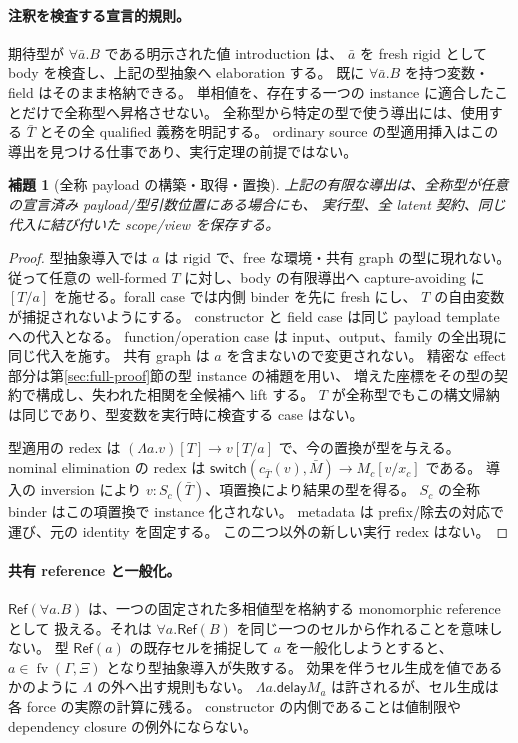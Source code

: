 \documentclass[11pt,a4paper]{article}
\newtheorem{lemma}[definition]{補題}
\newcommand{\Delay}{\mathsf{delay}}
\newcommand{\fv}{\operatorname{fv}}
\begin{document}
\paragraph{注釈を検査する宣言的規則。}
期待型が \(\forall\bar a.B\) である明示された値 introduction は、
\(\bar a\) を fresh rigid として body を検査し、上記の型抽象へ elaboration する。
既に \(\forall\bar a.B\) を持つ変数・field はそのまま格納できる。
単相値を、存在する一つの instance に適合したことだけで全称型へ昇格させない。
全称型から特定の型で使う導出には、使用する \(\bar T\) とその全 qualified 義務を明記する。
ordinary source の型適用挿入はこの導出を見つける仕事であり、実行定理の前提ではない。

\begin{lemma}[全称 payload の構築・取得・置換]
\label{lem:rank2-payload}
上記の有限な導出は、全称型が任意の宣言済み payload/型引数位置にある場合にも、
実行型、全 latent 契約、同じ代入に結び付いた scope/view を保存する。
\end{lemma}
\begin{proof}
型抽象導入では \(a\) は rigid で、free な環境・共有 graph の型に現れない。
従って任意の well-formed \(T\) に対し、body の有限導出へ capture-avoiding に
\([T/a]\) を施せる。forall case では内側 binder を先に fresh にし、
\(T\) の自由変数が捕捉されないようにする。
constructor と field case は同じ payload template への代入となる。
function/operation case は input、output、family の全出現に同じ代入を施す。
共有 graph は \(a\) を含まないので変更されない。
精密な effect 部分は第\ref{sec:full-proof}節の型 instance の補題を用い、
増えた座標をその型の契約で構成し、失われた相関を全候補へ lift する。
\(T\) が全称型でもこの構文帰納は同じであり、型変数を実行時に検査する case はない。

型適用の redex は
\((\Lambda a.v)[T]\longrightarrow v[T/a]\) で、今の置換が型を与える。
nominal elimination の redex は
\(\mathsf{switch}(c_{\bar T}(v),\bar M)\longrightarrow M_c[v/x_c]\) である。
導入の inversion により \(v:S_c(\bar T)\)、項置換により結果の型を得る。
\(S_c\) の全称 binder はこの項置換で instance 化されない。
metadata は prefix/除去の対応で運び、元の identity を固定する。
この二つ以外の新しい実行 redex はない。
\end{proof}

\paragraph{共有 reference と一般化。}
\(\mathsf{Ref}(\forall a.B)\) は、一つの固定された多相値型を格納する monomorphic reference として
扱える。それは \(\forall a.\mathsf{Ref}(B)\) を同じ一つのセルから作れることを意味しない。
型 \(\mathsf{Ref}(a)\) の既存セルを捕捉して \(a\) を一般化しようとすると、
\(a\in\fv(\Gamma,\Xi)\) となり型抽象導入が失敗する。
効果を伴うセル生成を値であるかのように \(\Lambda\) の外へ出す規則もない。
\(\Lambda a.\Delay M_a\) は許されるが、セル生成は各 force の実際の計算に残る。
constructor の内側であることは値制限や dependency closure の例外にならない。
\end{document}
